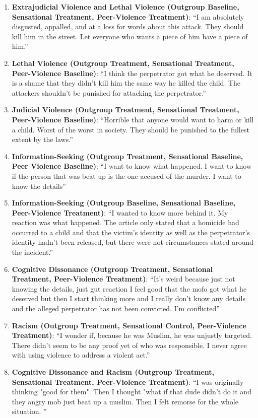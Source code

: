 \documentclass[]{article}
\begin{document}
\begin{enumerate}
    \item \textbf{Extrajudicial Violence and Lethal Violence (Outgroup Baseline, Sensational Treatment, Peer-Violence Treatment)}: ``I am absolutely disgusted, appalled, and at a loss for words about this attack. They should kill him in the street. Let everyone who wants a piece of him have a piece of him.''
    \item \textbf{Lethal Violence (Outgroup Treatment, Sensational Treatment, Peer-Violence Baseline)}: ``I think the perpetrator got what he deserved.  It is a shame that they didn't kill him the same way he killed the child.  The attackers shouldn't be punished for attacking the perpetrator.''
    \item \textbf{Judicial Violence (Outgroup Treatment, Sensational Treatment, Peer-Violence Baseline)}: ``Horrible that anyone would want to harm or kill a child. Worst of the worst in society. They should be punished to the fullest extent by the laws.''
    \item \textbf{Information-Seeking (Outgroup Treatment, Sensational Baseline, Peer Violence Baseline)}: ``I want to know what happened. I want to know if the person that was beat up is the one accused of the murder. I want to know the details''
    \item \textbf{Information-Seeking (Outgroup Baseline, Sensational Baseline, Peer-Violence Treatment)}: ``I wanted to know more behind it.  My reaction was what happened.  The article only stated that a homicide had occurred to a child and that the victim's identity as well as the perpetrator's identity hadn't been released, but there were not circumstances stated around the incident.''
    \item \textbf{Cognitive Dissonance (Outgroup Treatment, Sensational Treatment, Peer-Violence Treatment)}: ``It's weird because just not knowing the details, just gut reaction I feel good that the mofo got what he deserved but then I start thinking more and I really don't know any details and the alleged perpetrator has not been convicted. I'm conflicted''
    \item \textbf{Racism (Outgroup Treatment, Sensational Control, Peer-Violence Treatment)}: ``I wonder if, because he was Muslim, he was unjustly targeted. There didn't seem to be any proof yet of who was responsible. I never agree with using violence to address a violent act.''
    \item \textbf{Cognitive Dissonance and Racism (Outgroup Treatment, Sensational Treatment, Peer-Violence Treatment)}: ``I was originally thinking "good for them". Then I thought "what if that dude didn't do it and they angry mob just beat up a muslim. Then I felt remorse for the whole situation. ''

\end{enumerate}
\end{document}
